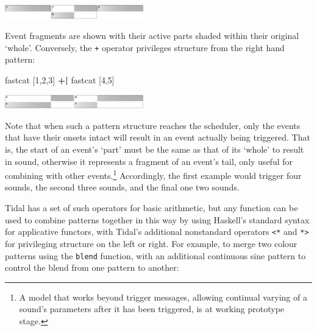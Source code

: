 \documentclass{nime-alternate} %
\newenvironment{Shaded}{\begin{snugshade}}{\end{snugshade}}
\newcommand{\DecValTok}[1]{\textcolor[rgb]{0.00,0.00,0.81}{#1}}
\newcommand{\NormalTok}[1]{#1}
\newcommand{\OperatorTok}[1]{\textcolor[rgb]{0.81,0.36,0.00}{\textbf{#1}}}
\newcommand{\StringTok}[1]{\textcolor[rgb]{0.31,0.60,0.02}{#1}}
\begin{document}
\includegraphics[width=0.45\textwidth]{figures/df0a301c3ac358e46fab2b793f180e9f_0.pdf}

Event fragments are shown with their active parts shaded within their
original `whole'. Conversely, the \texttt{+\textbar{}} operator
privileges structure from the right hand pattern:

\begin{Shaded}
\begin{Highlighting}[]
\NormalTok{fastcat [}\DecValTok{1}\NormalTok{,}\DecValTok{2}\NormalTok{,}\DecValTok{3}\NormalTok{] }\OperatorTok{+|}\NormalTok{ fastcat [}\DecValTok{4}\NormalTok{,}\DecValTok{5}\NormalTok{]}
\end{Highlighting}
\end{Shaded}

\includegraphics[width=0.45\textwidth]{figures/97e25ab63906058b5e790f194888828d_0.pdf}

Note that when such a pattern structure reaches the scheduler, only the
events that have their onsets intact will result in an event actually
being triggered. That is, the start of an event's `part' must be the
same as that of its `whole' to result in sound, otherwise it represents
a fragment of an event's tail, only useful for combining with other
events.\footnote{A model that works beyond trigger messages, allowing
  continual varying of a sound's parameters after it has been triggered,
  is at working prototype stage.} Accordingly, the first example would
trigger four sounds, the second three sounds, and the final one two
sounds.

Tidal has a set of such operators for basic arithmetic, but any function
can be used to combine patterns together in this way by using Haskell's
standard syntax for applicative functors, with Tidal's additional
nonstandard operators \texttt{\textless{}*} and \texttt{*\textgreater{}}
for privileging structure on the left or right. For example, to merge
two colour patterns using the \texttt{blend} function, with an
additional continuous sine pattern to control the blend from one pattern
to another:

\begin{Shaded}
\end{Shaded}
\end{document}
